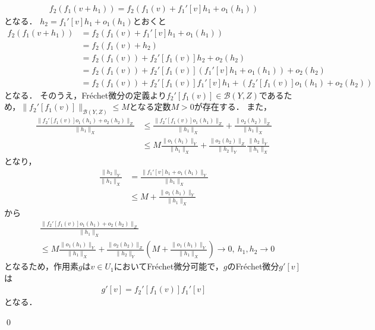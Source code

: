 \begin{Proof}
\begin{align*}
  f_2( f_1( v + h_1 ) ) = f_2( f_1(v) + f_1'[v] h_1 + o_1( h_1 ) )
\end{align*}
となる．
$h_2 =  f_1'[v] h_1 + o_1( h_1 )$とおくと
\begin{align*}
  f_2( f_1( v + h_1 ) ) &= f_2( f_1(v) + f_1'[v] h_1 + o_1( h_1 ) ) \\
&= f_2( f_1(v) + h_2) \\
&=  f_2( f_1(v) ) + f_2'[ f_1(v) ] h_2 + o_2( h_2 ) \\
&=  f_2( f_1(v) ) + f_2'[ f_1(v) ] ( f_1'[v] h_1 + o_1( h_1 ) ) + o_2( h_2 ) \\
&=  f_2( f_1(v) ) + f_2'[ f_1(v) ] f_1'[v] h_1 + \left( f_2'[ f_1(v) ] o_1( h_1 ) + o_2( h_2 ) \right)
\end{align*}
となる．
そのうえ，Fr\'echet微分の定義より$f_2'[ f_1(v) ] \in {\mathcal B}(Y, Z)$であるため，$\| f_2'[ f_1(v) ] \|_{{\mathcal B}(Y, Z)} \le M$となる定数$M > 0$が存在する．
また，
\begin{align*}
\frac{ \| f_2'[ f_1(v) ] o_1( h_1 ) + o_2( h_2 ) \|_{ Z } }{ \| h_1 \|_{ X } } &\le \frac{ \| f_2'[ f_1(v) ] o_1( h_1 ) \|_{Z} }{ \| h_1 \|_{ X } } + \frac{ \| o_2( h_2 ) \|_{ Z } }{ \| h_1 \|_{X} } \\
&\le M \frac{ \| o_1( h_1 ) \|_{Y} }{ \| h_1 \|_{ X } } + \frac{ \| o_2( h_2 ) \|_{ Z } }{ \| h_2 \|_{Y} } \frac{ \| h_2 \|_{Y} }{ \| h_1 \|_{X} }
\end{align*}
となり，
\begin{align*}
\frac{ \| h_2 \|_{Y} }{ \| h_1 \|_{X} } &= \frac{ \|  f_1'[v] h_1 + o_1( h_1 ) \|_{Y} }{ \| h_1 \|_{X} } \\
&\le M + \frac{ \| o_1( h_1 ) \|_{Y} }{ \| h_1 \|_{X} } 
\end{align*}
から
\begin{align*}
& \frac{ \| f_2'[ f_1(v) ] o_1( h_1 ) + o_2( h_2 ) \|_{ Z } }{ \| h_1 \|_{ X } } \\
&\le M \frac{ \| o_1( h_1 ) \|_{Y} }{ \| h_1 \|_{ X } } + \frac{ \| o_2( h_2 ) \|_{ Z } }{ \| h_2 \|_{Y} } \left( M + \frac{ \| o_1( h_1 ) \|_{Y} }{ \| h_1 \|_{X} }  \right) \rightarrow 0, ~ h_1, h_2 \rightarrow 0
\end{align*}
となるため，作用素$g$は$v \in U_1$においてFr\'echet微分可能で，$g$のFr\'echet微分$g'[v]$は
\begin{align*}
g'[v] = f_2'[ f_1( v ) ] f_1'[ v ]
\end{align*}
となる．

\qed
\end{Proof}




